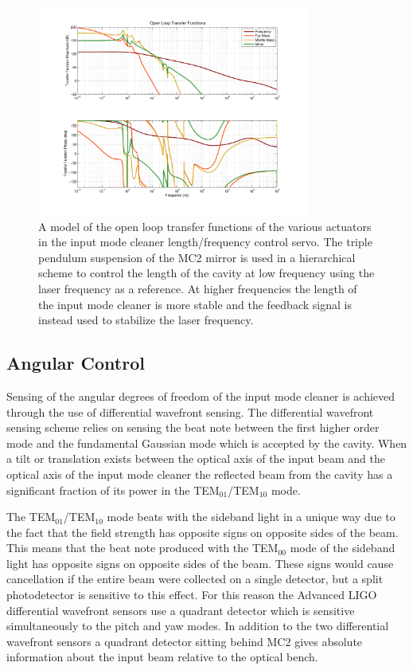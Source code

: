 \documentclass[10pt]{article}
\begin{document}
\begin{figure}
	\centering
	\includegraphics[width=0.8\textwidth,trim = 2.5cm 2cm 2.5cm 1.5cm]{Open_Loop_Tfs.pdf}
	\caption{A model of the open loop transfer functions of the various actuators in the 
		input mode cleaner length/frequency control servo.  
		The triple pendulum suspension of the MC2 mirror is used in a hierarchical scheme to 
		control the length of the cavity at low frequency using the laser frequency as a reference.  
		At higher frequencies the length of the input mode cleaner is more stable and the feedback 
		signal is instead used to stabilize the laser frequency.}
	\label{fig:ControlLoops}
\end{figure}


\subsection{Angular Control}
Sensing of the angular degrees of freedom of the input mode cleaner is achieved through 
the use of differential wavefront sensing\cite{Anderson1984}\cite{Fritschel1998}.  
The differential wavefront sensing scheme relies on sensing the beat note between 
the first higher order mode and the fundamental Gaussian mode which is accepted by the cavity.  
When a tilt or translation exists between the optical axis of the input beam and the optical axis 
of the input mode cleaner the reflected beam from the cavity has a significant fraction of its 
power in the TEM$_{01}$/TEM$_{10}$ mode\cite{Morrison1994}.  

The TEM$_{01}$/TEM$_{10}$ mode beats with the sideband light in a unique way due to the 
fact that the field strength has opposite signs on opposite sides of the beam.  
This means that the beat note produced with the TEM$_{00}$ mode of the sideband light 
has opposite signs on opposite sides of the beam.  
These signs would cause cancellation if the entire beam were collected on a 
single detector, but a split photodetector is sensitive to this effect.  
For this reason the Advanced LIGO differential wavefront sensors use a quadrant detector 
which is sensitive simultaneously to the pitch and yaw modes.
In addition to the two differential wavefront sensors a quadrant detector sitting 
behind MC2 gives absolute information about the input beam relative to the optical bench.
\end{document}
